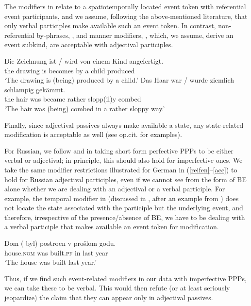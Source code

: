 \documentclass[output=paper,modfonts,newtxmath,hidelinks
]{langscibook}
\begin{document}
\noindent The modifiers in  relate to a spatiotemporally located event token with referential event participants, and we assume, following the above-mentioned literature, that only verbal participles make available such an event token. In contrast, non-referential by-phrases, , and manner modifiers, , which, we assume,  derive an event subkind, are acceptable with adjectival participles. 

\ea\label{acc}
\ea\gll	Die Zeichnung ist / wird von einem Kind angefertigt.\label{zeichnung}\\
	the drawing is {} becomes by a child produced \\
\glt	`The drawing is (being) produced by a child.'
\ex\gll	Das Haar war / wurde ziemlich schlampig gek\"{a}mmt.\label{schlampig}\\
	the hair was {} became rather slopp(il)y combed\\
\glt	`The hair was (being) combed in a rather sloppy way.'
\z\z

\noindent Finally, since adjectival passives always make available a state, any state-related modification is acceptable as well (see op.cit. for examples).

For Russian, we follow \citet{schoorlemmer95} and \citet{borik13, borik14} in  taking short form perfective PPPs to be either verbal or adjectival; in principle, this should also hold for imperfective ones. We take the same modifier restrictions illustrated for German in (\ref{reifen}--\ref{acc}) to hold for Russian adjectival participles, even if we cannot see from the form of BE alone whether we are dealing with an adjectival or a verbal participle. For example, the temporal modifier in  (discussed in \citealt{borik14}, after an example from \citealt{paslawskastechow}) does not locate the state associated with the participle but the underlying event, and therefore, irrespective of the presence/absence of BE, we have to be dealing with a verbal participle that makes available an event token for modification.

\ea\gll	Dom (\hspace{-2pt} byl) postroen v prošlom godu.\\
	house.\textsc{nom} {} was built.\textsc{pf} in last year\\
\glt `The house was built last year.'\label{dom}
\z
	
\noindent Thus, if we find such event-related modifiers in our data with imperfective PPPs, we can take these to be verbal. This would then refute (or at least seriously jeopardize) the claim that they can appear only in adjectival passives. 
\end{document}
